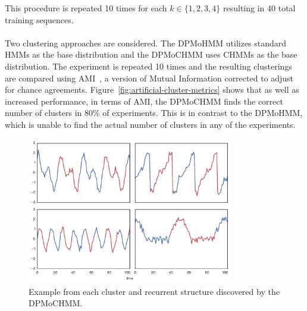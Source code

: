 \documentclass[12pt]{report}
\newcommand{\1}[0]{\mathbbm{1}}
\begin{document}
This procedure is repeated 10 times for each $k \in \{1,2,3,4\}$ resulting in 40
total training sequences.
\\\\
Two clustering approaches are considered. The \ac{DPMoHMM} utilizes standard \acp{HMM}
as the base distribution and the \ac{DPMoCHMM} uses \acp{CHMM} as the base distribution.
The experiment is repeated 10 times and the resulting clusterings are compared using
\ac{AMI}~\cite{ami}, a version of Mutual Information corrected to adjust for chance agreements.
Figure~\ref{fig:artificial-cluster-metrics} shows that as well as increased performance,
in terms of \ac{AMI}, the \ac{DPMoCHMM} finds the correct number of clusters in 80\% of experiments.
This is in contrast to the \ac{DPMoHMM}, which is unable to find the actual number of clusters in any
of the experiments.

\begin{figure}[H]
    \centering
    \includegraphics[width=0.8\textwidth]{./img/artificial-clusters.pdf}
    \caption[Visualization of synthetic sequence clusters]{
        Example from each cluster and recurrent structure
        discovered by the \ac{DPMoCHMM}.
    }
    \label{fig:artificial-clusters}
\end{figure}
\end{document}
